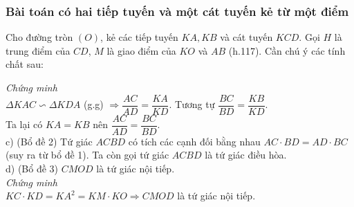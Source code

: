 \subsubsection{Bài toán có hai tiếp tuyến và một cát tuyến kẻ từ một điểm}
Cho đường tròn $(O)$, kẻ các tiếp tuyến $KA,KB$ và cát tuyến $KCD$. Gọi $H$ là trung điểm của $CD$, $M$ là giao điểm của $KO$ và $AB$ (h.117). Cần chú ý các tính chất sau: 
{
}
\noindent \textit{Chứng minh} \\
$\Delta KAC \backsim \Delta KDA$ (g.g) $\Rightarrow \dfrac{AC}{AD}=\dfrac{KA}{KD}$. Tương tự $\dfrac{BC}{BD} =\dfrac{KB}{KD}$. \\
Ta lại có $KA=KB$ nên $\dfrac{AC}{AD} = \dfrac{BC}{BD}.$ \\
c) (Bổ đề 2) Tứ giác $ACBD$  có tích các cạnh đối bằng nhau $AC \cdot BD = AD \cdot BC$ (suy ra   từ bổ đề 1). Ta còn gọi tứ giác $ACBD$ là tứ giác điều hòa. \\
d) (Bổ đề 3) $CMOD$ là tứ giác nội tiếp. \\
\textit{Chứng minh}  \\
$KC \cdot KD =KA^2 = KM \cdot KO \Rightarrow CMOD$ là tứ giác nội tiếp.


